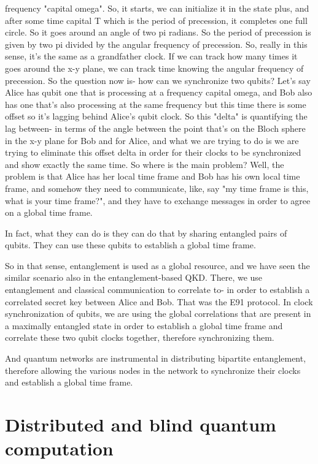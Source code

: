 frequency "capital omega". So, it starts, we can initialize it in the state plus, and after some time capital T which is the period of precession, it completes one full circle. So it goes around an angle of two pi radians. So the period of precession is given by two pi divided by the angular frequency of precession. So, really in this sense, it's the same as a grandfather clock. If we can track how many times it goes around the x-y plane, we can track time knowing the angular frequency of precession. So the question now is- how can we synchronize two qubits? Let's say Alice has qubit one that is processing at a frequency capital omega, and Bob also has one that's also processing at the same frequency but this time there is some offset so it's lagging behind Alice's qubit clock. So this "delta" is quantifying the lag between- in terms of the angle between the point that's on the Bloch sphere in the x-y plane for Bob and for Alice, and what we are trying to do is we are trying to eliminate this offset delta in order for their clocks to be synchronized and show exactly the same time. So where is the main problem? Well, the problem is that Alice has her local time frame and Bob has his own local time frame, and somehow they need to communicate, like, say "my time frame is this, what is your time frame?", and they have to exchange messages in order to agree on a global time frame.

In fact, what they can do is they can do that by sharing entangled pairs of qubits. They can use these qubits to establish a global time frame.

So in that sense, entanglement is used as a global resource, and we have seen the similar scenario also in the entanglement-based QKD. There, we use entanglement and classical communication to correlate to- in order to establish a correlated secret key between Alice and Bob. That was the E91 protocol. In clock synchronization of qubits, we are using the global correlations that are present in a maximally entangled state in order to establish a global time frame and correlate these two qubit clocks together, therefore synchronizing them.

And quantum networks are instrumental in distributing bipartite entanglement, therefore allowing the various nodes in the network to synchronize their clocks and establish a global time frame.



\section{Distributed and blind quantum computation}
\label{sec:14-4_distributed_bqc}

